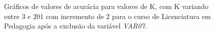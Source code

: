 \begin{figure}[!htb]
  \centering
  \caption{\label{knnKResultsPedNoVar7} Gráficos de valores de acurácia para valores de K, com K variando entre \(3\) e \(201\) com incremento de \(2\) para o curso de Licenciatura em Pedagogia após a exclusão da variável \textit{VAR07}.}
  \qquad
  \vspace{1.5em}
  \Ididthis
\end{figure}

